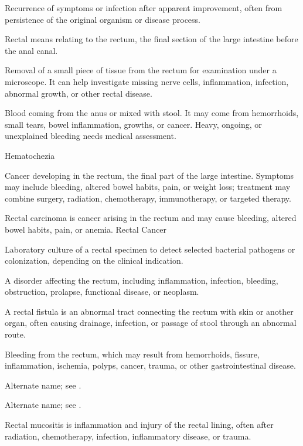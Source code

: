  Recurrence of symptoms or infection after apparent improvement, often from persistence of the original organism or disease process.

 Rectal means relating to the rectum, the final section of the large intestine before the anal canal.

 Removal of a small piece of tissue from the rectum for examination under a microscope. It can help investigate missing nerve cells, inflammation, infection, abnormal growth, or other rectal disease.

 Blood coming from the anus or mixed with stool. It may come from hemorrhoids, small tears, bowel inflammation, growths, or cancer. Heavy, ongoing, or unexplained bleeding needs medical assessment.

\synonyms
Hematochezia

 Cancer developing in the rectum, the final part of the large intestine. Symptoms may include bleeding, altered bowel habits, pain, or weight loss; treatment may combine surgery, radiation, chemotherapy, immunotherapy, or targeted therapy.

 Rectal carcinoma is cancer arising in the rectum and may cause bleeding, altered bowel habits, pain, or anemia.
\synonyms
Rectal Cancer

 Laboratory culture of a rectal specimen to detect selected bacterial pathogens or colonization, depending on the clinical indication.

 A disorder affecting the rectum, including inflammation, infection, bleeding, obstruction, prolapse, functional disease, or neoplasm.

 A rectal fistula is an abnormal tract connecting the rectum with skin or another organ, often causing drainage, infection, or passage of stool through an abnormal route.

 Bleeding from the rectum, which may result from hemorrhoids, fissure, inflammation, ischemia, polyps, cancer, trauma, or other gastrointestinal disease.

 Alternate name; see .

 Alternate name; see .

 Rectal mucositis is inflammation and injury of the rectal lining, often after radiation, chemotherapy, infection, inflammatory disease, or trauma.

